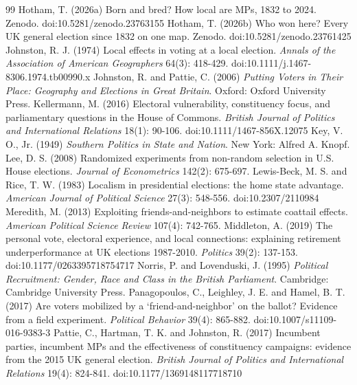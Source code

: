 \documentclass[11pt,a4paper]{article}
\begin{document}
\begin{thebibliography}{99}
 Hotham, T. (2026a) Born and bred? How local are MPs, 1832 to 2024. Zenodo. doi:10.5281/zenodo.23763155
 Hotham, T. (2026b) Who won here? Every UK general election since 1832 on one map. Zenodo. doi:10.5281/zenodo.23761425
 Johnston, R. J. (1974) Local effects in voting at a local election. \textit{Annals of the Association of American Geographers} 64(3): 418-429. doi:10.1111/j.1467-8306.1974.tb00990.x
 Johnston, R. and Pattie, C. (2006) \textit{Putting Voters in Their Place: Geography and Elections in Great Britain}. Oxford: Oxford University Press.
 Kellermann, M. (2016) Electoral vulnerability, constituency focus, and parliamentary questions in the House of Commons. \textit{British Journal of Politics and International Relations} 18(1): 90-106. doi:10.1111/1467-856X.12075
 Key, V. O., Jr. (1949) \textit{Southern Politics in State and Nation}. New York: Alfred A. Knopf.
 Lee, D. S. (2008) Randomized experiments from non-random selection in U.S. House elections. \textit{Journal of Econometrics} 142(2): 675-697.
 Lewis-Beck, M. S. and Rice, T. W. (1983) Localism in presidential elections: the home state advantage. \textit{American Journal of Political Science} 27(3): 548-556. doi:10.2307/2110984
 Meredith, M. (2013) Exploiting friends-and-neighbors to estimate coattail effects. \textit{American Political Science Review} 107(4): 742-765.
 Middleton, A. (2019) The personal vote, electoral experience, and local connections: explaining retirement underperformance at UK elections 1987-2010. \textit{Politics} 39(2): 137-153. doi:10.1177/0263395718754717
 Norris, P. and Lovenduski, J. (1995) \textit{Political Recruitment: Gender, Race and Class in the British Parliament}. Cambridge: Cambridge University Press.
 Panagopoulos, C., Leighley, J. E. and Hamel, B. T. (2017) Are voters mobilized by a `friend-and-neighbor' on the ballot? Evidence from a field experiment. \textit{Political Behavior} 39(4): 865-882. doi:10.1007/s11109-016-9383-3
 Pattie, C., Hartman, T. K. and Johnston, R. (2017) Incumbent parties, incumbent MPs and the effectiveness of constituency campaigns: evidence from the 2015 UK general election. \textit{British Journal of Politics and International Relations} 19(4): 824-841. doi:10.1177/1369148117718710

\end{thebibliography}
\end{document}
